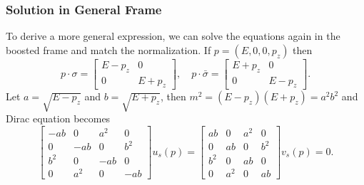 \subsubsection*{Solution in General Frame}
To derive a more general expression, we can solve the equations again in the boosted frame and match the normalization. 
If $p=(E,0,0,p_z)$ then
\begin{equation}
	p \cdot \sigma=\left[\begin{array}{cc}
		E-p_{z} & 0 \\
		0 & E+p_{z}
	\end{array}\right], \quad 
	p \cdot \bar{\sigma}=\left[\begin{array}{cc}
		E+p_{z} & 0 \\
		0 & E-p_{z}
	\end{array}\right].
\end{equation}
Let $a=\sqrt{E-p_{z}}$ and $b=\sqrt{E+p_{z}}$, then $m^{2}=\left(E-p_{z}\right)\left(E+p_{z}\right)=a^{2} b^{2}$ and Dirac equation becomes
\begin{equation}
	\left[\begin{array}{cccc}
		-a b & 0 & a^{2} & 0 \\
		0 & -a b & 0 & b^{2} \\
		b^{2} & 0 & -a b & 0 \\
		0 & a^{2} & 0 & -a b
	\end{array}\right] u_{s}(p) = 
	\left[\begin{array}{cccc}
		a b & 0 & a^{2} & 0 \\
		0 & a b & 0 & b^{2} \\
		b^{2} & 0 & a b & 0 \\
		0 & a^{2} & 0 & a b
	\end{array}\right] v_{s}(p) = 0.
\end{equation}

